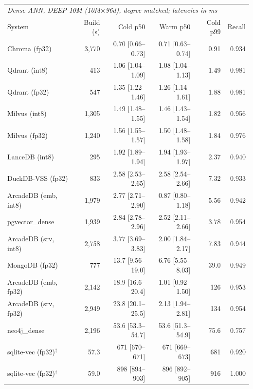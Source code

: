 \begin{tabular}{lrrrrr}
\toprule
\multicolumn{6}{l}{\textit{Dense ANN, DEEP-10M (10M$\times$96d), degree-matched; latencies in ms}} \\
System & Build (s) & Cold p50 & Warm p50 & Cold p99 & Recall \\
\midrule
Chroma (fp32) & 3{,}770 & 0.70 [0.66--0.73] & 0.71 [0.63--0.74] & 0.91 & 0.934 \\
Qdrant (int8) & 413 & 1.06 [1.04--1.09] & 1.08 [1.04--1.13] & 1.49 & 0.981 \\
Qdrant (fp32) & 547 & 1.35 [1.22--1.46] & 1.26 [1.14--1.61] & 1.88 & 0.981 \\
Milvus (int8) & 1{,}305 & 1.49 [1.48--1.55] & 1.46 [1.43--1.54] & 1.82 & 0.956 \\
Milvus (fp32) & 1{,}240 & 1.56 [1.55--1.57] & 1.50 [1.48--1.58] & 1.84 & 0.976 \\
LanceDB (int8) & 295 & 1.92 [1.89--1.94] & 1.94 [1.93--1.97] & 2.37 & 0.940 \\
DuckDB-VSS (fp32) & 833 & 2.58 [2.53--2.65] & 2.58 [2.54--2.66] & 7.32 & 0.933 \\
ArcadeDB (emb, int8) & 1{,}979 & 2.77 [2.71--2.90] & 0.87 [0.80--1.18] & 5.56 & 0.942 \\
pgvector_dense & 1{,}939 & 2.84 [2.78--2.96] & 2.52 [2.11--2.66] & 3.78 & 0.954 \\
ArcadeDB (srv, int8) & 2{,}758 & 3.77 [3.69--3.83] & 2.00 [1.84--2.17] & 7.83 & 0.944 \\
MongoDB (fp32) & 777 & 13.7 [9.56--19.0] & 6.76 [5.55--8.03] & 39.0 & 0.949 \\
ArcadeDB (emb, fp32) & 2{,}142 & 18.9 [16.6--20.4] & 1.01 [0.92--1.50] & 126 & 0.953 \\
ArcadeDB (srv, fp32) & 2{,}949 & 23.8 [20.1--25.5] & 2.13 [1.94--2.81] & 134 & 0.954 \\
neo4j_dense & 2{,}196 & 53.6 [53.3--54.7] & 53.6 [51.3--54.9] & 75.6 & 0.757 \\
sqlite-vec (fp32)$^{\dagger}$ & 57.3 & 671 [670--671] & 671 [669--673] & 681 & 0.920 \\
sqlite-vec (fp32)$^{\dagger}$ & 59.0 & 898 [894--903] & 896 [892--905] & 916 & 1.000 \\
\bottomrule
\end{tabular}
